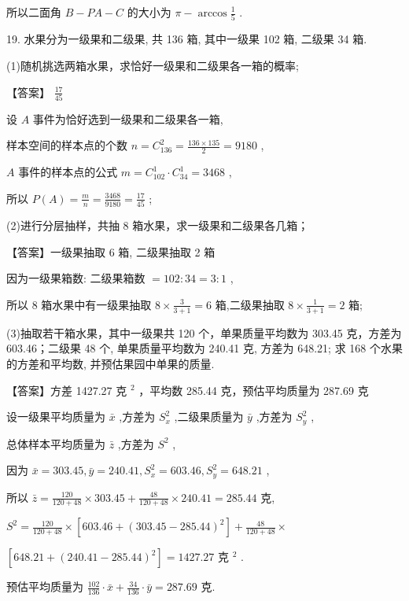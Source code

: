 \documentclass[10pt]{article}
\begin{document}
所以二面角 \(B - {PA} - C\) 的大小为 \(\pi  - \arccos \frac{1}{5}\) .

19. 水果分为一级果和二级果, 共 136 箱, 其中一级果 102 箱, 二级果 34 箱.

(1)随机挑选两箱水果，求恰好一级果和二级果各一箱的概率;

【答案】 \(\frac{17}{45}\)

设 \(A\) 事件为恰好选到一级果和二级果各一箱,

样本空间的样本点的个数 \(n = {C}_{136}^{2} = \frac{{136} \times  {135}}{2} = {9180}\) ,

\(A\) 事件的样本点的公式 \(m = {C}_{102}^{1} \cdot  {C}_{34}^{1} = {3468}\) ,

所以 \(P\left( A\right)  = \frac{m}{n} = \frac{3468}{9180} = \frac{17}{45}\) ;

(2)进行分层抽样，共抽 8 箱水果，求一级果和二级果各几箱；

【答案】一级果抽取 6 箱, 二级果抽取 2 箱

因为一级果箱数: 二级果箱数 \(= {102} : {34} = 3 : 1\) ,

所以 8 箱水果中有一级果抽取 \(8 \times  \frac{3}{3 + 1} = 6\) 箱,二级果抽取 \(8 \times  \frac{1}{3 + 1} = 2\) 箱;

(3)抽取若干箱水果，其中一级果共 120 个，单果质量平均数为 303.45 克，方差为 603.46；二级果 48 个, 单果质量平均数为 240.41 克, 方差为 648.21; 求 168 个水果的方差和平均数, 并预估果园中单果的质量.

【答案】方差 1427.27 克 \({}^{2}\) ，平均数 285.44 克，预估平均质量为 287.69 克

设一级果平均质量为 \(\bar{x}\) ,方差为 \({S}_{x}^{2}\) ,二级果质量为 \(\bar{y}\) ,方差为 \({S}_{y}^{2}\) ,

总体样本平均质量为 \(\bar{z}\) ,方差为 \({S}^{2}\) ,

因为 \(\bar{x} = {303.45},\bar{y} = {240.41},{S}_{x}^{2} = {603.46},{S}_{y}^{2} = {648.21}\) ,

所以 \(\bar{z} = \frac{120}{{120} + {48}} \times  {303.45} + \frac{48}{{120} + {48}} \times  {240.41} = {285.44}\) 克,

\({S}^{2} = \frac{120}{{120} + {48}} \times  \left\lbrack  {{603.46} + {\left( {303.45} - {285.44}\right) }^{2}}\right\rbrack   + \frac{48}{{120} + {48}} \times\)

\(\left\lbrack  {{648.21} + {\left( {240.41} - {285.44}\right) }^{2}}\right\rbrack   = {1427.27}\) 克 \({}^{2}\) .

预估平均质量为 \(\frac{102}{136} \cdot  \bar{x} + \frac{34}{136} \cdot  \bar{y} = {287.69}\) 克.
\end{document}
